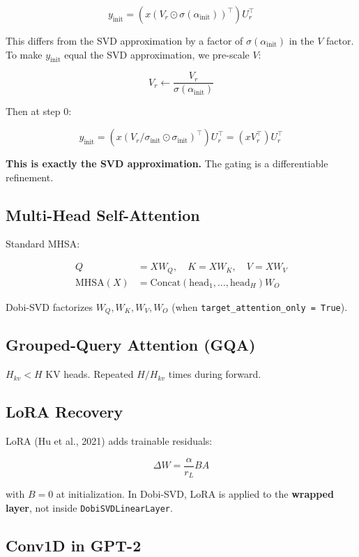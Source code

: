 \[
y_\text{init} = (x (V_r \odot \sigma(\alpha_\text{init}))^\top) U_r^\top
\tag{3.6}
\]

This differs from the SVD approximation by a factor of $\sigma(\alpha_\text{init})$ 
in the $V$ factor. To make $y_\text{init}$ equal the SVD approximation, 
we pre-scale $V$:

\[
V_r \leftarrow \frac{V_r}{\sigma(\alpha_\text{init})}
\tag{3.7}
\]

Then at step 0:

\[
y_\text{init} = (x (V_r / \sigma_\text{init} \odot \sigma_\text{init})^\top) U_r^\top = (x V_r^\top) U_r^\top
\tag{3.8}
\]

\textbf{This is exactly the SVD approximation.} The gating is a differentiable 
refinement.

\subsection{Multi-Head Self-Attention}

Standard MHSA:

\[
\begin{aligned}
Q &= X W_Q, \quad K = X W_K, \quad V = X W_V \\
\text{MHSA}(X) &= \text{Concat}(\text{head}_1, \dots, \text{head}_H) W_O
\end{aligned}
\tag{3.9}
\]

Dobi-SVD factorizes $W_Q, W_K, W_V, W_O$ (when \texttt{target\_attention\_only = True}).

\subsection{Grouped-Query Attention (GQA)}

$H_{kv} < H$ KV heads. Repeated $H / H_{kv}$ times during forward.

\subsection{LoRA Recovery}

LoRA (Hu et al., 2021) adds trainable residuals:

\[
\Delta W = \frac{\alpha}{r_L} B A
\tag{3.10}
\]

with $B = 0$ at initialization. In Dobi-SVD, LoRA is applied to the 
\textbf{wrapped layer}, not inside \texttt{DobiSVDLinearLayer}.

\subsection{Conv1D in GPT-2}

